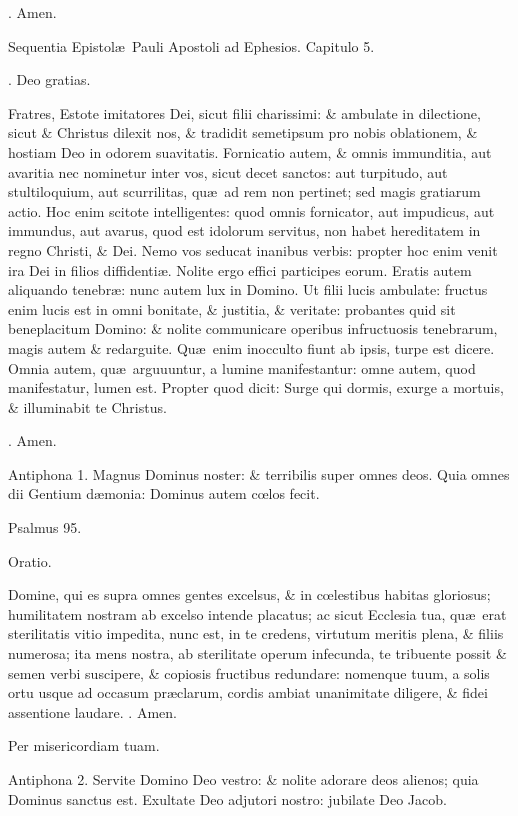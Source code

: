 \documentclass[letter,11pt]{book}
\makeatletter
\DeclareRobustCommand{\Rbar}{\vers@resp{0pt}{R}}
\newcommand{\vers@resp@sym}{\raisebox{0.2ex}{\rotatebox[origin=c]{-20}{$\m@th\rceil$}}}
\newcommand{\vers@resp}[2]{%
  {\ooalign{\hidewidth\kern#1\vers@resp@sym\hidewidth\cr#2\cr}}%
}%
\def\R{\color{Red} \Rbar . \color{black}}
\makeatother
\begin{document}
\begin{multicols*}{2}
\R Amen.

Sequentia Epistol\ae \ Pauli Apostoli ad Ephesios. Capitulo 5.

\R Deo gratias.

Fratres, Estote imitatores Dei, sicut filii charissimi: \& ambulate in dilectione, sicut \& Christus dilexit nos, \& tradidit semetipsum pro nobis oblationem, \& hostiam Deo in odorem suavitatis. Fornicatio autem, \& omnis immunditia, aut avaritia nec nominetur inter vos, sicut decet sanctos: aut turpitudo, aut stultiloquium, aut scurrilitas, qu\ae \ ad rem non pertinet; sed magis gratiarum actio. Hoc enim scitote intelligentes: quod omnis fornicator, aut impudicus, aut immundus, aut avarus, quod est idolorum servitus, non habet hereditatem in regno Christi, \& Dei. Nemo vos seducat inanibus verbis: propter hoc enim venit ira Dei in filios diffidenti\ae . Nolite ergo effici participes eorum. Eratis autem aliquando tenebr\ae : nunc autem lux in Domino. Ut filii lucis ambulate: fructus enim lucis est in omni bonitate, \& justitia, \& veritate: probantes quid sit beneplacitum Domino: \& nolite communicare operibus infructuosis tenebrarum, magis autem \& redarguite. Qu\ae \ enim inocculto fiunt ab ipsis, turpe est dicere. Omnia autem, qu\ae \ arguuuntur, a lumine manifestantur: omne autem, quod manifestatur, lumen est. Propter quod dicit: Surge qui dormis, exurge a mortuis, \& illuminabit te Christus.

\R Amen.

Antiphona 1. Magnus Dominus noster: \& terribilis super omnes deos. Quia omnes dii Gentium d\ae monia: Dominus autem c\oe los fecit.

Psalmus 95.

Oratio.

Domine, qui es supra omnes gentes excelsus, \& in c\oe lestibus habitas gloriosus; humilitatem nostram ab excelso intende placatus; ac sicut Ecclesia tua, qu\ae \ erat sterilitatis vitio impedita, nunc est, in te credens, virtutum meritis plena, \& filiis numerosa; ita mens nostra, ab sterilitate operum infecunda, te tribuente possit \& semen verbi suscipere, \& copiosis fructibus redundare: nomenque tuum, a solis ortu usque ad occasum pr\ae clarum, cordis ambiat unanimitate diligere, \& fidei assentione laudare.
\R Amen.

Per misericordiam tuam.

Antiphona 2. Servite Domino Deo vestro: \& nolite adorare deos alienos; quia Dominus sanctus est. Exultate Deo adjutori nostro: jubilate Deo Jacob.


\end{multicols*}
\end{document}

